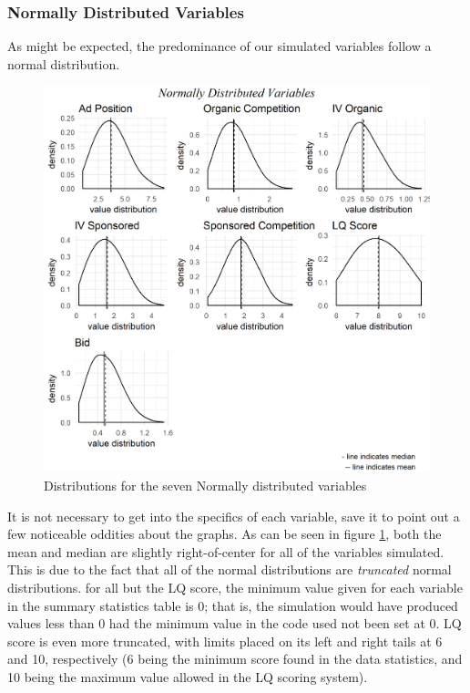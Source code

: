 \subsubsection{Normally Distributed Variables}
As might be expected, the predominance of our simulated variables follow a normal distribution.\\ 
\begin{figure}[!h]
    \centering
    \includegraphics[scale = 0.72]{normal_plots.png}
    \caption{Distributions for the seven Normally distributed variables}
    \label{fig:Normal}
\end{figure}
It is not necessary to get into the specifics of each variable, save it to point out a few noticeable oddities about the graphs. As can be seen in figure \ref{fig:Normal}, both the mean and median are slightly right-of-center for all of the variables simulated. This is due to the fact that all of the normal distributions are \textit{truncated} normal distributions. for all but the LQ score, the minimum value given for each variable in the summary statistics table is 0; that is, the simulation would have produced values less than 0 had the minimum value in the code used not been set at 0. LQ score is even more truncated, with limits placed on its left and right tails at 6 and 10, respectively (6 being the minimum score found in the data statistics, and 10 being the maximum value allowed in the LQ scoring system).


